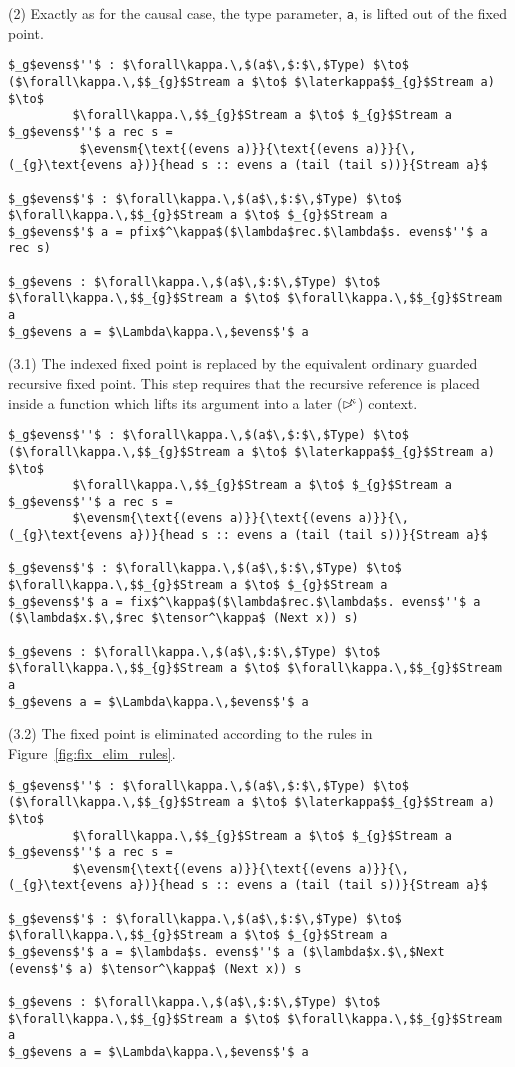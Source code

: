 (2) Exactly as for the causal case, the type parameter, \texttt{a}, is lifted out of the fixed point.
\begin{lstlisting}[mathescape]
$_g$evens$''$ : $\forall\kappa.\,$(a$\,$:$\,$Type) $\to$ ($\forall\kappa.\,$$_{g}$Stream a $\to$ $\laterkappa$$_{g}$Stream a) $\to$ 
         $\forall\kappa.\,$$_{g}$Stream a $\to$ $_{g}$Stream a
$_g$evens$''$ a rec s =
          $\evensm{\text{(evens a)}}{\text{(evens a)}}{\,(_{g}\text{evens a})}{head s :: evens a (tail (tail s))}{Stream a}$

$_g$evens$'$ : $\forall\kappa.\,$(a$\,$:$\,$Type) $\to$ $\forall\kappa.\,$$_{g}$Stream a $\to$ $_{g}$Stream a
$_g$evens$'$ a = pfix$^\kappa$($\lambda$rec.$\lambda$s. evens$''$ a rec s)

$_g$evens : $\forall\kappa.\,$(a$\,$:$\,$Type) $\to$ $\forall\kappa.\,$$_{g}$Stream a $\to$ $\forall\kappa.\,$$_{g}$Stream a
$_g$evens a = $\Lambda\kappa.\,$evens$'$ a
\end{lstlisting}
(3.1) The indexed fixed point is replaced by the equivalent ordinary guarded
recursive fixed point. This step requires that the recursive reference is
placed inside a function which lifts its argument into a later ($\rhd^{\!\!\kappa}$) context.
\begin{lstlisting}[mathescape]
$_g$evens$''$ : $\forall\kappa.\,$(a$\,$:$\,$Type) $\to$ ($\forall\kappa.\,$$_{g}$Stream a $\to$ $\laterkappa$$_{g}$Stream a) $\to$ 
         $\forall\kappa.\,$$_{g}$Stream a $\to$ $_{g}$Stream a
$_g$evens$''$ a rec s =
         $\evensm{\text{(evens a)}}{\text{(evens a)}}{\,(_{g}\text{evens a})}{head s :: evens a (tail (tail s))}{Stream a}$

$_g$evens$'$ : $\forall\kappa.\,$(a$\,$:$\,$Type) $\to$ $\forall\kappa.\,$$_{g}$Stream a $\to$ $_{g}$Stream a
$_g$evens$'$ a = fix$^\kappa$($\lambda$rec.$\lambda$s. evens$''$ a ($\lambda$x.$\,$rec $\tensor^\kappa$ (Next x)) s)

$_g$evens : $\forall\kappa.\,$(a$\,$:$\,$Type) $\to$ $\forall\kappa.\,$$_{g}$Stream a $\to$ $\forall\kappa.\,$$_{g}$Stream a
$_g$evens a = $\Lambda\kappa.\,$evens$'$ a
\end{lstlisting}
(3.2) The fixed point is eliminated according to the rules in Figure~\ref{fig:fix_elim_rules}.
\begin{lstlisting}[mathescape]
$_g$evens$''$ : $\forall\kappa.\,$(a$\,$:$\,$Type) $\to$ ($\forall\kappa.\,$$_{g}$Stream a $\to$ $\laterkappa$$_{g}$Stream a) $\to$ 
         $\forall\kappa.\,$$_{g}$Stream a $\to$ $_{g}$Stream a
$_g$evens$''$ a rec s =
         $\evensm{\text{(evens a)}}{\text{(evens a)}}{\,(_{g}\text{evens a})}{head s :: evens a (tail (tail s))}{Stream a}$

$_g$evens$'$ : $\forall\kappa.\,$(a$\,$:$\,$Type) $\to$ $\forall\kappa.\,$$_{g}$Stream a $\to$ $_{g}$Stream a
$_g$evens$'$ a = $\lambda$s. evens$''$ a ($\lambda$x.$\,$Next (evens$'$ a) $\tensor^\kappa$ (Next x)) s

$_g$evens : $\forall\kappa.\,$(a$\,$:$\,$Type) $\to$ $\forall\kappa.\,$$_{g}$Stream a $\to$ $\forall\kappa.\,$$_{g}$Stream a
$_g$evens a = $\Lambda\kappa.\,$evens$'$ a
\end{lstlisting}
